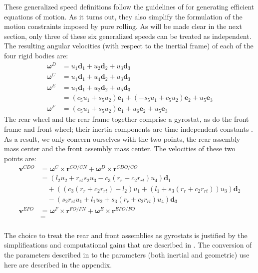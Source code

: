 \documentclass[letterpaper,11pt]{article}
\newcommand{\bs}[1]{ \boldsymbol{ #1 } }
\begin{document}
These generalized speed definitions follow the guidelines of \cite{Mitiguy1996}
for generating efficient equations of motion.  As it turns out, they also
simplify the formulation of the motion constraints imposed by pure rolling.  As
will be made clear in the next section, only three of these six generalized
speeds can be treated as independent.  The resulting angular velocities (with
respect to the inertial frame) of each of the four rigid bodies are:
\begin{align*}
  \bs{\omega}^D & = u_1 \bs{d}_1 + u_2 \bs{d}_2 + u_3 \bs{d}_3 \\
  \bs{\omega}^C & = u_1 \bs{d}_1 + u_4 \bs{d}_2 + u_3 \bs{d}_3 \\
  \bs{\omega}^E & = u_1 \bs{d}_1 + u_2 \bs{d}_2 + u_5 \bs{d}_3 \\
                & = (c_5 u_1 + s_5 u_2)\bs{e}_1 + (-s_5 u_1 + c_5 u_2) \bs{e}_2
                    + u_5 \bs{e}_3 \\
  \bs{\omega}^F & = (c_5 u_1 + s_5 u_2)\bs{e}_1 + u_6 \bs{e}_2
                    + u_5 \bs{e}_3
\end{align*}
The rear wheel and the rear frame together comprise a gyrostat, as do the front frame
and front wheel; their inertia components are time independent constants
\cite{Wittenburg1977}.  As a result, we only concern ourselves with the two
points, the rear assembly mass center and the front assembly mass center.  The
velocities of these two points are:
\begin{align*}
  \bs{v}^{CDO} & = \bs{\omega}^C \times \bs{r}^{CO/CN} + \bs{\omega}^D \times
  \bs{r}^{CDO/CO}\\
  & = (l_2 u_2 + r_{rt} s_2 u_3 - c_3 (r_r + c_2 r_{rt}) u_4) \bs{d}_1 \\
  & \quad +
  ( (c_3 (r_r + c_2 r_{rt}) - l_2) u_1 + (l_1 + s_3 (r_r + c_2 r_{rt})) u_3) \bs{d}_2 \\
  & \quad -
  (s_2 r_{rt} u_1 + l_1 u_2 + s_3 (r_r + c_2 r_{rt}) u_4) \bs{d}_3\\
  \bs{v}^{EFO} & = \bs{\omega}^F \times \bs{r}^{FO/FN} + \bs{\omega}^E \times
  \bs{r}^{EFO/FO}\\
  & =\\
\end{align*}

The choice to treat the rear and front assemblies as gyrostats is justified by
the simplifications and computational gains that are described in
\cite{Mitiguy2001}.  The conversion of the parameters described in
\cite{Meijaard2007} to the parameters (both inertial and geometric) use here
are described in the appendix.
\end{document}
